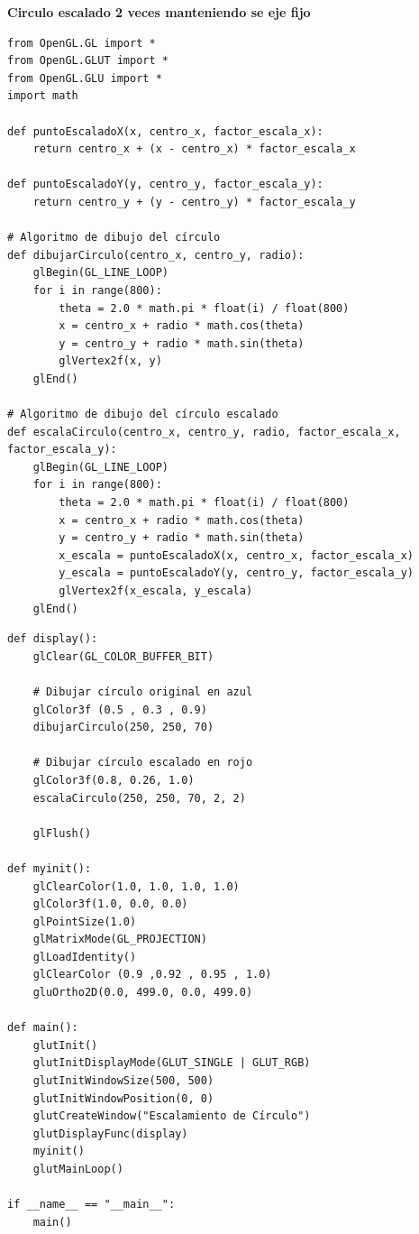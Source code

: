 \documentclass[a4paper]{article}
\begin{document}
\newpage
\Large{\textbf{Circulo escalado 2 veces manteniendo se eje fijo}}\\[-0.4cm]
\begin{center}
\begin{mycodeboxl}
\begin{lstlisting}
from OpenGL.GL import *
from OpenGL.GLUT import *
from OpenGL.GLU import *
import math

def puntoEscaladoX(x, centro_x, factor_escala_x):
    return centro_x + (x - centro_x) * factor_escala_x

def puntoEscaladoY(y, centro_y, factor_escala_y):
    return centro_y + (y - centro_y) * factor_escala_y

# Algoritmo de dibujo del círculo
def dibujarCirculo(centro_x, centro_y, radio):
    glBegin(GL_LINE_LOOP)
    for i in range(800):
        theta = 2.0 * math.pi * float(i) / float(800)
        x = centro_x + radio * math.cos(theta)
        y = centro_y + radio * math.sin(theta)
        glVertex2f(x, y)
    glEnd()

# Algoritmo de dibujo del círculo escalado
def escalaCirculo(centro_x, centro_y, radio, factor_escala_x, factor_escala_y):
    glBegin(GL_LINE_LOOP)
    for i in range(800):
        theta = 2.0 * math.pi * float(i) / float(800)
        x = centro_x + radio * math.cos(theta)
        y = centro_y + radio * math.sin(theta)
        x_escala = puntoEscaladoX(x, centro_x, factor_escala_x)
        y_escala = puntoEscaladoY(y, centro_y, factor_escala_y)
        glVertex2f(x_escala, y_escala)
    glEnd()
\end{lstlisting}
\end{mycodeboxl}
\end{center}
\newpage
\begin{center}
\begin{mycodebox}
\begin{lstlisting}
def display():
    glClear(GL_COLOR_BUFFER_BIT)
    
    # Dibujar círculo original en azul
    glColor3f (0.5 , 0.3 , 0.9)
    dibujarCirculo(250, 250, 70)
    
    # Dibujar círculo escalado en rojo
    glColor3f(0.8, 0.26, 1.0)
    escalaCirculo(250, 250, 70, 2, 2)
    
    glFlush()

def myinit():
    glClearColor(1.0, 1.0, 1.0, 1.0)
    glColor3f(1.0, 0.0, 0.0)
    glPointSize(1.0)
    glMatrixMode(GL_PROJECTION)
    glLoadIdentity()
    glClearColor (0.9 ,0.92 , 0.95 , 1.0)
    gluOrtho2D(0.0, 499.0, 0.0, 499.0)

def main():
    glutInit()
    glutInitDisplayMode(GLUT_SINGLE | GLUT_RGB)
    glutInitWindowSize(500, 500)
    glutInitWindowPosition(0, 0)
    glutCreateWindow("Escalamiento de Círculo")
    glutDisplayFunc(display)
    myinit()
    glutMainLoop()

if __name__ == "__main__":
    main()
  
\end{lstlisting}
\end{mycodebox}
\end{center}
\end{document}
